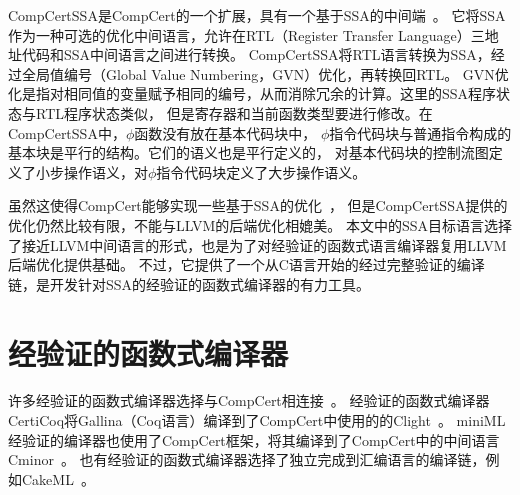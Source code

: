 CompCertSSA是CompCert的一个扩展，具有一个基于SSA的中间端~\cite{compcertssa}。
它将SSA作为一种可选的优化中间语言，允许在RTL（Register Transfer Language）三地址代码和SSA中间语言之间进行转换。
CompCertSSA将RTL语言转换为SSA，经过全局值编号（Global Value Numbering，GVN）优化，再转换回RTL。
GVN优化是指对相同值的变量赋予相同的编号，从而消除冗余的计算。这里的SSA程序状态与RTL程序状态类似，
但是寄存器和当前函数类型要进行修改。在CompCertSSA中，$\phi$函数没有放在基本代码块中，
$\phi$指令代码块与普通指令构成的基本块是平行的结构。它们的语义也是平行定义的，
对基本代码块的控制流图定义了小步操作语义，对$\phi$指令代码块定义了大步操作语义。

虽然这使得CompCert能够实现一些基于SSA的优化~\cite{compcertssa-op,blazy-cpp2023}，
但是CompCertSSA提供的优化仍然比较有限，不能与LLVM的后端优化相媲美。
本文中的SSA目标语言选择了接近LLVM中间语言的形式，也是为了对经验证的函数式语言编译器复用LLVM后端优化提供基础。
不过，它提供了一个从C语言开始的经过完整验证的编译链，是开发针对SSA的经验证的函数式编译器的有力工具。


\section{经验证的函数式编译器} \label{sec:relatedf}

许多经验证的函数式编译器选择与CompCert相连接~\cite{belanger2019certified, dargaye2009verification}。
经验证的函数式编译器CertiCoq将Gallina（Coq语言）编译到了CompCert中使用的的Clight~\cite{belanger2019certified}。
miniML经验证的编译器也使用了CompCert框架，将其编译到了CompCert中的中间语言Cminor~\cite{dargaye2009verification}。
也有经验证的函数式编译器选择了独立完成到汇编语言的编译链，例如CakeML~\cite{cakeml2016}。

